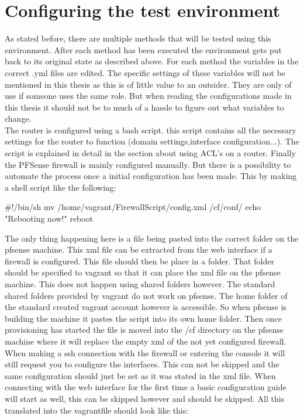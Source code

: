 \section {Configuring the test environment}
As stated before, there are multiple methods that will be tested using this environment. After each method has been executed the environment gets put back to its original state as described above. For each method the variables in the correct .yml files are edited. The specific settings of these variables will not be mentioned in this thesis as this is of little value to an outsider. They are only of use if someone uses the same role. But when reading the configurations made in this thesis it should not be to much of a hassle to figure out what variables to change.\\
The router is configured using a bash script. this script contains all the necessary settings for the router to function (domain settings,interface configuration...). The script is explained in detail in the section about using ACL's on a router. Finally the PFSense firewall is mainly configured manually. But there is a possibility to automate the process once a initial configuration has been made. This by making a shell script like the following:
\begin{cisco}[title=PFSense script]
#!/bin/sh
mv /home/vagrant/FirewallScript/config.xml /cf/conf/
echo "Rebooting now!"
reboot
\end{cisco}
The only thing happening here is a file being pasted into the correct folder on the pfsense machine. This xml file can be extracted from the web interface if a firewall is configured. This file should then be place in a folder. That folder should be specified to vagrant so that it can place the xml file on the pfsense machine. This does not happen using shared folders however. The standard shared folders provided by vagrant do not work on pfsense. The home folder of the standard created vagrant account however is accessible. So when pfsense is building the machine it pastes the script into its own home folder. Then once provisioning has started the file is moved into the /cf directory on the pfsense machine where it will replace the empty xml of the not yet configured firewall. When making a ssh connection with the firewall or entering the console it will still request you to configure the interfaces. This can not be skipped and the same configuration should just be set as it was stated in the xml file. When connecting with the web interface for the first time a basic configuration guide will start as well, this can be skipped however and should be skipped. All this translated into the vagrantfile should look like this:
